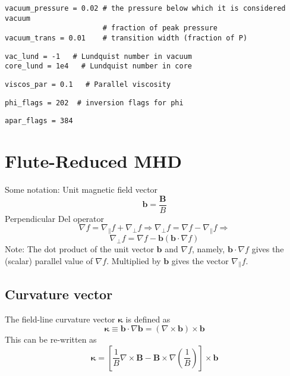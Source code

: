 \documentclass[12pt, a4paper]{article}
\newcommand{\Vec}[1]{\ensuremath{\mathbf{#1}}}
\newcommand{\Bvec}{\Vec{B}}
\newcommand{\Curl}[1]{\ensuremath{\nabla\times #1 }}
\begin{document}
\begin{verbatim}
vacuum_pressure = 0.02 # the pressure below which it is considered vacuum
                       # fraction of peak pressure
vacuum_trans = 0.01    # transition width (fraction of P)
\end{verbatim}

\begin{verbatim}
vac_lund = -1   # Lundquist number in vacuum
core_lund = 1e4   # Lundquist number in core
\end{verbatim}

\begin{verbatim}
viscos_par = 0.1   # Parallel viscosity
\end{verbatim}

\begin{verbatim}
phi_flags = 202  # inversion flags for phi
\end{verbatim}

\begin{verbatim}
apar_flags = 384
\end{verbatim}

\section{Flute-Reduced MHD}
\label{sec:equations}

Some notation:
Unit magnetic field vector
\[
\Vec{b} = \frac{\Bvec}{B}
\]
Perpendicular Del operator
\[
\nabla f = \nabla_\parallel f  + \nabla_\perp f \Rightarrow  \nabla_\perp f = \nabla f - \nabla_\parallel f \Rightarrow 
\]
\[
\nabla_\perp f = \nabla f - \Vec{b}\left(\Vec{b}\cdot\nabla f\right)
\]
Note: The dot product of the unit vector $\Vec{b}$ and $\nabla f$, namely, $\Vec{b} \cdot \nabla f$ gives the (scalar) parallel value of $\nabla f $. Multiplied by $\Vec{b}$ gives the vector $\nabla_\parallel f$.

\subsection{Curvature vector}

The field-line curvature vector $\Vec{\kappa}$ is defined as
\begin{equation}
\Vec{\kappa} \equiv \Vec{b}\cdot\nabla\Vec{b} = \left(\nabla\times\Vec{b}\right)\times\Vec{b}
\end{equation}
This can be re-written as
\[
\Vec{\kappa} = \left[\frac{1}{B}\Curl{\Bvec} - \Bvec\times\nabla\left(\frac{1}{B}\right)\right]\times\Vec{b}
\]
\end{document}
